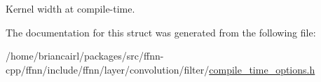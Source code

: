 Kernel width at compile-\/time. 



The documentation for this struct was generated from the following file\-:\begin{DoxyCompactItemize}
\item 
/home/briancairl/packages/src/ffnn-\/cpp/ffnn/include/ffnn/layer/convolution/filter/\hyperlink{convolution_2filter_2compile__time__options_8h}{compile\-\_\-time\-\_\-options.\-h}\end{DoxyCompactItemize}
